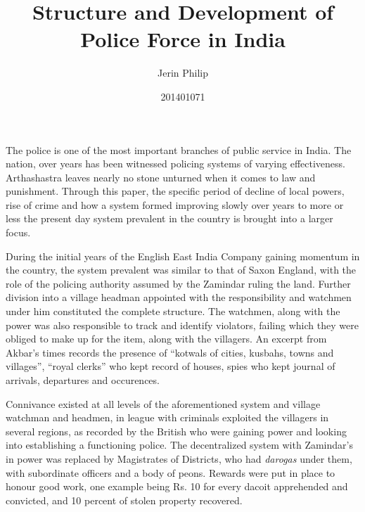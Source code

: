 \documentclass[twocolumn,a4paper]{article}
\title{Structure and Development of Police Force in India}
\author{Jerin Philip}
\date{201401071}
\begin{document}
\maketitle
The police is one of the most important branches of public
service in India. The nation, over years has been witnessed
policing systems of varying effectiveness. Arthashastra leaves
nearly no stone unturned when it comes to law and punishment.
Through this paper, the specific period of decline of local
powers, rise of crime and how a system formed improving slowly
over years to more or less the present day system prevalent in
the country is brought into a larger focus.

During the initial years of the English East India Company
gaining momentum in the country, the system prevalent was
similar to that of Saxon England\cite[p. 5]{india1913history},
with the role of the policing authority assumed by the Zamindar
ruling the land. Further division into a village headman
appointed with the responsibility and watchmen under him
constituted the complete structure. The watchmen, along with the
power was also responsible to track and identify violators,
failing which they were obliged to make up for the item, along
with the villagers\cite[p. 5]{india1913history}. 
An excerpt from Akbar's times\cite[p. 6]{india1913history}
records the presence of ``kotwals of cities, kusbahs, towns and
villages'', ``royal clerks'' who kept record of houses, spies
who kept journal of arrivals, departures and occurences.

Connivance existed at all levels of the aforementioned system
and village watchman and headmen, in league with criminals
exploited the villagers in several regions, as recorded by the
British who were gaining power and looking into establishing a
functioning police. The decentralized system with Zamindar's in
power was replaced by\cite[p. 8]{india1913history} Magistrates
of Districts, who had \emph{darogas} under them, with
subordinate officers and a body of peons. Rewards were put in
place to honour good work, one example being Rs. 10 for every
dacoit apprehended and convicted, and 10 percent of stolen
property recovered.
\end{document}
